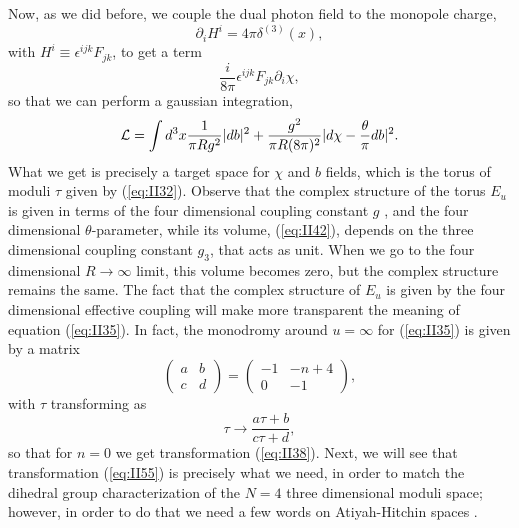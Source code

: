 Now, as we did before, we couple the dual photon field to the
monopole charge,
\begin{equation}
\partial_i H^{i} = 4\pi \delta^{(3)} (x),
\label{eq:II50}
\end{equation}
with $H^{i} \equiv \epsilon^{ijk}F_{jk}$, to get a term
\begin{equation}
\frac {i}{8\pi} \epsilon^{ijk}F_{jk}\partial_i \chi,
\label{eq:II51}
\end{equation}
so that we can perform a gaussian integration,
\begin{equation}
{\cal L} = \int d^3 x \frac {1}{\pi Rg^2} |db|^2 + \frac
{g^2}{\pi R(8\pi)^2} | d \chi - \frac {\theta}{\pi} db|^2.
\label{eq:II52}
\end{equation}
What we get is precisely a target space for $\chi$ and $b$
fields, which is the torus of moduli $\tau$ given by
(\ref{eq:II32}). Observe that the
complex structure of the torus $E_u$ is given in terms of the
four dimensional coupling constant $g$ \cite{SW3d}, and the four dimensional
$\theta$-parameter, while its volume, (\ref{eq:II42}), depends on the three
dimensional coupling constant $g_3$, that acts as unit. When we
go to the four dimensional $R \rightarrow \infty$ limit, this
volume becomes zero, but the complex structure remains the same.
The fact that the complex structure of $E_u$ is given by the four
dimensional effective coupling will make more transparent the
meaning of equation (\ref{eq:II35}). In fact, the monodromy
around $u=\infty$ for (\ref{eq:II35}) is given by a matrix
\begin{equation}
\left( \begin{array}{cc} a & b  \\
			 c & d 
	\end{array} \right) = 
\left( \begin{array}{cc} -1 & -n+4  \\
			 0 & -1 
	\end{array} \right),
\label{eq:II55}
\end{equation}
with $\tau$ transforming as
\begin{equation}
\tau \rightarrow \frac {a\tau +b}{c\tau +d},
\label{eq:II56a}
\end{equation}
so that for $n=0$ we get transformation (\ref{eq:II38}). Next, we
will see that transformation (\ref{eq:II55}) is precisely what we
need, in order to match the dihedral group characterization of
the $N\!=\!4$ three dimensional moduli space; however, in order to do
that we need a few words on Atiyah-Hitchin spaces \cite{AH}.


